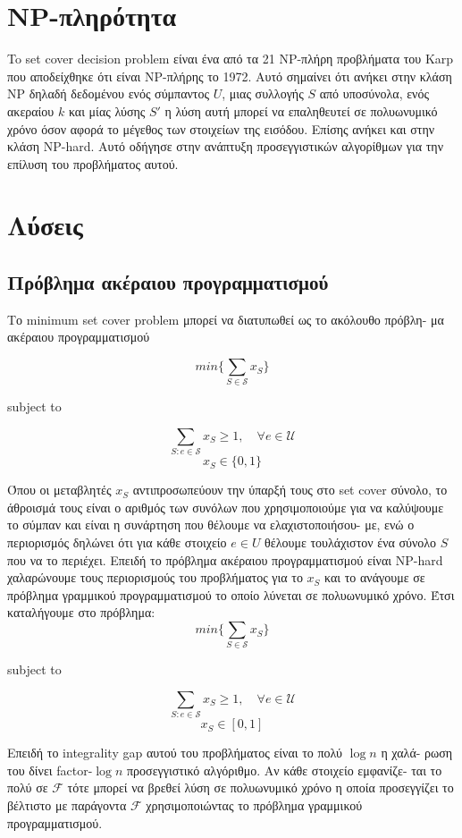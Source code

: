 \section{NP-πληρότητα}

To set cover decision problem είναι ένα από τα 21 NP-πλήρη προβλήματα του Karp που αποδείχθηκε ότι είναι NP-πλήρης το 1972. Αυτό σημαίνει ότι ανήκει στην κλάση NP δηλαδή δεδομένου ενός σύμπαντος $U$, μιας συλλογής $S$ από υποσύνολα, ενός ακεραίου $k$ και μίας λύσης $S'$ η λύση αυτή μπορεί να επαληθευτεί σε πολυωνυμικό χρόνο όσον αφορά το μέγεθος των στοιχείων της εισόδου. Επίσης ανήκει και στην κλάση NP-hard. Αυτό οδήγησε στην ανάπτυξη προσεγγιστικών αλγορίθμων για την επίλυση του προβλήματος αυτού.


\section{Λύσεις}

\subsection{Πρόβλημα ακέραιου προγραμματισμού}

Το minimum set cover problem μπορεί να διατυπωθεί ως το ακόλουθο πρόβλη- μα ακέραιου προγραμματισμού

$$min\{\displaystyle\sum_{S\in{\mathcal{S}}} x_S\}$$ 
\centerline{subject to}
$$\displaystyle\sum_{S:e\in{\mathcal{S}}} x_S \geq{1}, \quad \forall e \in{\mathcal{U}}$$
$$ x_S \in{\{0, 1\}}$$

\justify
{
Όπου οι μεταβλητές $x_S$ αντιπροσωπεύουν την ύπαρξή τους στο set cover σύνολο, το άθροισμά τους είναι ο αριθμός των συνόλων που χρησιμοποιούμε για να καλύψουμε το σύμπαν και είναι η συνάρτηση που θέλουμε να ελαχιστοποιήσου- με, ενώ ο περιορισμός δηλώνει ότι για κάθε στοιχείο $e \in{U}$ θέλουμε τουλάχιστον ένα σύνολο $S$ που να το περιέχει.
Επειδή το πρόβλημα ακέραιου προγραμματισμού είναι NP-hard χαλαρώνουμε τους περιορισμούς του προβλήματος για το $x_S$ και το ανάγουμε σε πρόβλημα γραμμικού προγραμματισμού το οποίο λύνεται σε πολυωνυμικό χρόνο. Έτσι καταλήγουμε στο πρόβλημα:
}
$$min\{\displaystyle\sum_{S\in{\mathcal{S}}} x_S\}$$ 
\centerline{subject to}
$$\displaystyle\sum_{S:e\in{\mathcal{S}}} x_S \geq{1}, \quad \forall e \in{\mathcal{U}}$$
$$ x_S \in{[0, 1]}$$

Επειδή το integrality gap αυτού του προβλήματος είναι το πολύ $\log{n}$ η χαλά- ρωση του δίνει factor-$\log{n}$ προσεγγιστικό αλγόριθμο.
Αν κάθε στοιχείο εμφανίζε- ται το πολύ σε ${\mathcal{F}}$ τότε μπορεί να βρεθεί λύση σε πολυωνυμικό χρόνο η οποία προσεγγίζει το βέλτιστο με παράγοντα ${\mathcal{F}}$ χρησιμοποιώντας το πρόβλημα γραμμικού προγραμματισμού.

